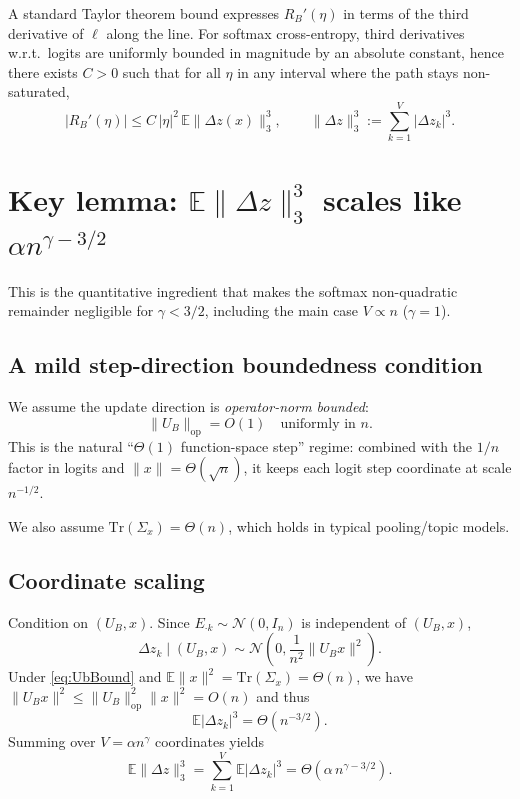 \documentclass[11pt]{article}
\begin{document}
A standard Taylor theorem bound expresses $R_B'(\eta)$ in terms of the third derivative of $\ell$ along the line.
For softmax cross-entropy, third derivatives w.r.t.\ logits are uniformly bounded in magnitude by an absolute constant,
hence there exists $C>0$ such that for all $\eta$ in any interval where the path stays non-saturated,
\begin{equation}
\label{eq:Rprime}
|R_B'(\eta)| \le C\,|\eta|^2\,\mathbb{E}\|\Delta z(x)\|_3^3,
\qquad
\|\Delta z\|_3^3:=\sum_{k=1}^V|\Delta z_k|^3.
\end{equation}

\section{Key lemma: $\mathbb{E}\|\Delta z\|_3^3$ scales like $\alpha n^{\gamma-3/2}$}

This is the quantitative ingredient that makes the softmax non-quadratic remainder negligible for $\gamma<3/2$,
including the main case $V\propto n$ ($\gamma=1$).

\subsection{A mild step-direction boundedness condition}
We assume the update direction is \emph{operator-norm bounded}:
\begin{equation}
\label{eq:UbBound}
\|U_B\|_{\mathrm{op}} = O(1)
\quad\text{uniformly in }n.
\end{equation}
This is the natural ``$\Theta(1)$ function-space step'' regime: combined with the $1/n$ factor in logits and $\|x\|=\Theta(\sqrt n)$,
it keeps each logit step coordinate at scale $n^{-1/2}$.

We also assume $\mathrm{Tr}(\Sigma_x)=\Theta(n)$, which holds in typical pooling/topic models.

\subsection{Coordinate scaling}
Condition on $(U_B,x)$. Since $E_{\cdot k}\sim\mathcal{N}(0,I_n)$ is independent of $(U_B,x)$,
\[
\Delta z_k \mid (U_B,x)\sim \mathcal{N}\!\left(0,\frac{1}{n^2}\|U_B x\|^2\right).
\]
Under \eqref{eq:UbBound} and $\mathbb{E}\|x\|^2=\mathrm{Tr}(\Sigma_x)=\Theta(n)$,
we have $\|U_B x\|^2\le \|U_B\|_{\mathrm{op}}^2\|x\|^2=O(n)$ and thus
\[
\mathbb{E}|\Delta z_k|^3 = \Theta(n^{-3/2}).
\]
Summing over $V=\alpha n^\gamma$ coordinates yields
\begin{equation}
\label{eq:l3scale}
\mathbb{E}\|\Delta z\|_3^3
=
\sum_{k=1}^V \mathbb{E}|\Delta z_k|^3
=
\Theta\!\left(\alpha\,n^{\gamma-3/2}\right).
\end{equation}
\end{document}
